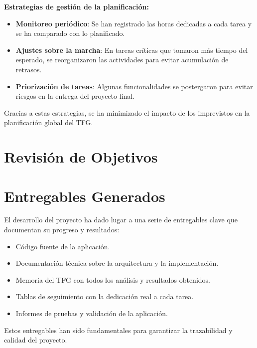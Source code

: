\textbf{Estrategias de gestión de la planificación:}

\begin{itemize}
    \item \textbf{Monitoreo periódico}: Se han registrado las horas dedicadas a cada tarea y se ha comparado con lo planificado.
    \item \textbf{Ajustes sobre la marcha}: En tareas críticas que tomaron más tiempo del esperado, se reorganizaron las actividades para evitar acumulación de retrasos.
    \item \textbf{Priorización de tareas}: Algunas funcionalidades se postergaron para evitar riesgos en la entrega del proyecto final.
\end{itemize}

Gracias a estas estrategias, se ha minimizado el impacto de los imprevistos en la planificación global del TFG.

\section{Revisión de Objetivos}

\section{Entregables Generados}

El desarrollo del proyecto ha dado lugar a una serie de entregables clave que documentan su progreso y resultados:

\begin{itemize}
    \item Código fuente de la aplicación.
    \item Documentación técnica sobre la arquitectura y la implementación.
    \item Memoria del TFG con todos los análisis y resultados obtenidos.
    \item Tablas de seguimiento con la dedicación real a cada tarea.
    \item Informes de pruebas y validación de la aplicación.
\end{itemize}

Estos entregables han sido fundamentales para garantizar la trazabilidad y calidad del proyecto.


